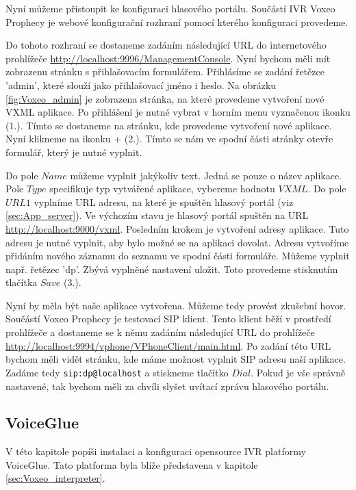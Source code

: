 \documentclass[ing,male,java,dept460]{diploma}						%
\begin{document}

Nyní můžeme přistoupit ke konfiguraci hlasového portálu. Součástí IVR Voxeo Prophecy je webové konfigurační rozhraní pomocí kterého konfiguraci provedeme.

Do tohoto rozhraní se dostaneme zadáním následující URL do internetového prohlížeče \url{http://localhost:9996/ManagementConsole}. Nyní bychom měli mít zobrazenu stránku s přihlašovacím formulářem. Přihlásíme se zadání řetězce 'admin', které slouží jako přihlašovací jméno i heslo. Na obrázku \ref{fig:Voxeo_admin} je zobrazena stránka, na které provedeme vytvoření nové VXML aplikace. Po přihlášení je nutné vybrat v horním menu vyznačenou ikonku (1.). Tímto se dostaneme na stránku, kde provedeme vytvoření nové aplikace. Nyní klikneme na ikonku + (2.). Tímto se nám ve spodní části stránky otevře formulář, který je nutné vyplnit.

Do pole $Name$ můžeme vyplnit jakýkoliv text. Jedná se pouze o název aplikace. Pole $Type$ specifikuje typ vytvářené aplikace, vybereme hodnotu $VXML$. Do pole $URL1$ vyplníme URL adresu, na které je spuštěn hlasový portál (viz \ref{sec:App_server}). Ve výchozím stavu je hlasový portál spuštěn na URL \url{http://localhost:9000/vxml}. Posledním krokem je vytvoření adresy aplikace. Tuto adresu je nutné vyplnit, aby bylo možné se na aplikaci dovolat. Adresu vytvoříme přidáním nového záznamu do seznamu ve spodní části formuláře. Můžeme vyplnit např. řetězec 'dp'. Zbývá vyplněné nastavení uložit. Toto provedeme stisknutím tlačítka $Save$ (3.).

Nyní by měla být naše aplikace vytvořena. Můžeme tedy provést zkušební hovor. Součástí Voxeo Prophecy je testovací SIP klient. Tento klient běží v prostředí prohlížeče a dostaneme se k němu zadáním následující URL do prohlížeče \url{http://localhost:9994/vphone/VPhoneClient/main.html}. Po zadání této URL bychom měli vidět stránku, kde máme možnost vyplnit SIP adresu naší aplikace. Zadáme tedy \texttt{sip:dp@localhost} a stiskneme tlačítko $Dial$. Pokud je vše správně nastavené, tak bychom měli za chvíli slyšet uvítací zprávu hlasového portálu.

\subsection{VoiceGlue}
V této kapitole popíši instalaci a konfiguraci opensource IVR platformy VoiceGlue. Tato platforma byla blíže představena v kapitole \ref{sec:Voxeo_interpreter}.
\end{document}
